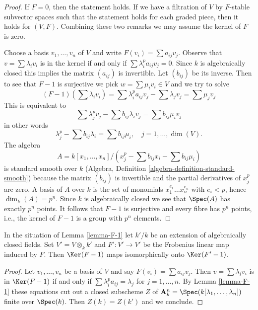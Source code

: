 \begin{proof}
If $F = 0$, then the statement holds. If we have a filtration of $V$ by
$F$-stable subvector spaces such that the statement holds for each
graded piece, then it holds for $(V, F)$. Combining these two remarks
we may assume the kernel of $F$ is zero.

\medskip\noindent
Choose a basis $v_1, \ldots, v_n$ of $V$ and write
$F(v_i) = \sum a_{ij} v_j$. Observe that $v = \sum \lambda_i v_i$
is in the kernel if and only if $\sum \lambda_i^p a_{ij} v_j = 0$.
Since $k$ is algebraically closed this implies the matrix $(a_{ij})$
is invertible. Let $(b_{ij})$ be its inverse. Then to see that $F - 1$
is surjective we pick $w = \sum \mu_i v_i \in V$ and we try to solve
$$
(F - 1)(\sum \lambda_iv_i) =
\sum \lambda_i^p a_{ij} v_j - \sum \lambda_j v_j = \sum \mu_j v_j
$$
This is equivalent to
$$
\sum \lambda_j^p v_j - \sum b_{ij} \lambda_i v_j = \sum b_{ij} \mu_i v_j
$$
in other words
$$
\lambda_j^p - \sum b_{ij} \lambda_i = \sum b_{ij} \mu_i,
\quad j = 1, \ldots, \dim(V).
$$
The algebra
$$
A = k[x_1, \ldots, x_n]/
(x_j^p - \sum b_{ij} x_i - \sum b_{ij} \mu_i)
$$
is standard smooth over $k$
(Algebra, Definition \ref{algebra-definition-standard-smooth})
because the matrix $(b_{ij})$ is invertible and the partial derivatives
of $x_j^p$ are zero. A basis of $A$ over $k$ is the set of monomials
$x_1^{e_1} \ldots x_n^{e_n}$ with $e_i < p$, hence $\dim_k(A) = p^n$.
Since $k$ is algebraically closed we see that $\Spec(A)$ has exactly
$p^n$ points. It follows that $F - 1$ is surjective and every fibre
has $p^n$ points, i.e., the kernel of $F - 1$ is a group with $p^n$ elements.
\end{proof}

\begin{lemma}
\label{lemma-F-2}
In the situation of Lemma \ref{lemma-F-1} let $k'/k$ be an extension
of algebraically closed fields. Set $V' = V \otimes_k k'$ and
$F' : V' \to V'$ be the Frobenius linear map induced by $F$.
Then $\Ker(F - 1)$ maps isomorphically onto $\Ker(F' - 1)$.
\end{lemma}

\begin{proof}
Let $v_1, \ldots, v_n$ be a basis of $V$ and say $F(v_i) = \sum a_{ij}v_j$.
Then $v = \sum \lambda_i v_i$ is in $\Ker(F - 1)$ if and only if
$\sum \lambda_i^pa_{ij} = \lambda_j$ for $j = 1, \ldots, n$.
By Lemma \ref{lemma-F-1} these equations
cut out a closed subscheme $Z$ of
$\mathbf{A}^n_k = \Spec(k[\lambda_1, \ldots, \lambda_n])$
finite over $\Spec(k)$. Then $Z(k) = Z(k')$ and we conclude.
\end{proof}

